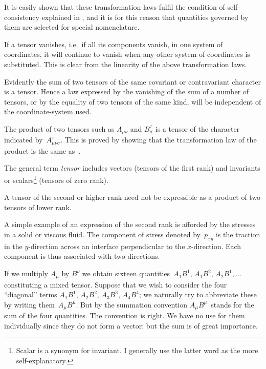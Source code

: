 \documentclass[12pt]{book}
\begin{document}
It is easily shown that these transformation laws fulfil the condition of
self\hyp{}consistency explained in , and it is for this reason that quantities
governed by them are selected for special nomenclature.

If a tensor vanishes, i.e.\ if all its components vanish, in one system of
coordinates, it will continue to vanish when any other system of coordinates
is substituted. This is clear from the linearity of the above transformation
laws.

Evidently the sum of two tensors of the same covariant or contravariant
character is a tensor. Hence a law expressed by the vanishing of the sum of
a number of tensors, or by the equality of two tensors of the same kind, will
be independent of the coordinate\hyp{}system used.

The product of two tensors such as $A_{\mu\nu}$ and $B_{\sigma}^{\tau}$ is a tensor of the character
indicated by~$A_{\mu\nu\sigma}^{\tau}$. This is proved by showing that the transformation law of
the product is the same as~.

The general term \emph{tensor} includes vectors (tensors of the first rank) and
invariants or scalars\footnote
  {Scalar is a synonym for invariant. I generally use the latter word as the more self\hyp{}explanatory.}
%
(tensors of zero rank).

A tensor of the second or higher rank need not be expressible as a product
of two tensors of lower rank.

A simple example of an expression of the second rank is afforded by the
stresses in a solid or viscous fluid. The component of stress denoted by~$p_{xy}$
is the traction in the $y$-direction across an interface perpendicular to the
$x$-direction. Each component is thus associated with two directions.


If we multiply $A_{\mu}$ by $B^{\nu}$ we obtain sixteen
quantities~$A_{1}B^{1}$, $A_{1}B^{2}$, $A_{2}B^{1},\ldots$
constituting a mixed tensor. Suppose that we wish to consider the four
``diagonal'' terms $A_{1}B^{1}$, $A_{2}B^{2}$, $A_{3}B^{3}$, $A_{4}B^{4}$; we naturally try to abbreviate
these by writing them~$A_{\mu}B^{\mu}$. But by the summation convention $A_{\mu}B^{\mu}$~stands
for the sum of the four quantities. The convention is right. We have no use
for them individually since they do not form a vector; but the sum is of great
importance.
\end{document}
